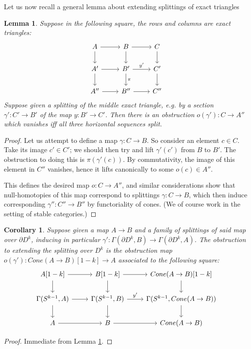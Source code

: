 \documentclass[12pt,a4paper]{article}
\numberwithin{equation}{section}
\newtheorem{lem}[equation]{Lemma}
\newtheorem{cor}[equation]{Corollary}
\theoremstyle{definition}
\theoremstyle{remark}
\begin{document}
Let us now recall a general lemma about extending splittings of exact triangles

\begin{lem} \label{some homological algebra}
   Suppose in the following square, the rows and columns are exact triangles:
$$
 \begin{tikzcd}
    A \ar[r] \ar[d] & B \ar[r] \ar[d] & C \ar[d] \\
    A' \ar[r] \ar[d] & B' \ar[r, "y'"] \ar[d, "\pi"] & C' \ar[d] \\
    A'' \ar[r]  & B'' \ar[r]  & C''
\end{tikzcd}
$$
    Suppose given a splitting of the middle exact triangle, e.g. by a section $\gamma': C' \to B'$ of the map $y: B' \to C'$.  Then there is an obstruction $o(\gamma'): C \to A''$ which vanishes iff all three horizontal sequences split.
\end{lem}
\begin{proof}
    Let us attempt to define a map $\gamma: C \to B$.  So consider an element $c \in C$.  Take its image $c' \in C'$; we should then try and lift $\gamma'(c')$ from $B$ to $B'$.  The obstruction to doing this is $\pi(\gamma'(c))$.  By commutativity, the image of this element in $C''$ vanishes, hence it lifts canonically to some $o(c) \in A''$.

    This defines the desired map $o: C \to A''$, and similar considerations show that null-homotopies of this map correspond to splittings $\gamma: C \to B$, which then induce corresponding $\gamma'': C'' \to B''$ by functoriality of cones.  (We of course work in the setting of stable categories.)
\end{proof}

\begin{cor}
   Suppose given a map $A \to B$ and a family of splittings of said map over $\partial D^k$, inducing in particular $\gamma': \Gamma(\partial D^k, B) \to \Gamma(\partial D^k, A)$.  The obstruction to extending the splitting over $D^k$ is the obstruction map $o(\gamma'): Cone(A \to B)[1-k] \to A$ associated to the following square:
   $$
 \begin{tikzcd}
    A[1-k] \ar[r] \ar[d] & B[1-k] \ar[r] \ar[d] & Cone(A\to B)[1-k] \ar[d] \\
    \Gamma(S^{k-1}, A) \ar[r] \ar[d] & \Gamma(S^{k-1}, B) \ar[r, "y'"] \ar[d] & \Gamma(S^{k-1}, Cone(A \to B)) \ar[d] \\
     A \ar[r]  & B \ar[r]  & Cone(A \to B)
\end{tikzcd}
$$
\end{cor}
\begin{proof}
    Immediate from Lemma \ref{some homological algebra}.
\end{proof}
\end{document}
